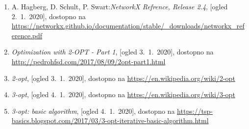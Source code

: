 \documentclass[12pt, a4paper]{article}
\begin{document}
\begin{enumerate}

\item A. Hagberg, D. Schult, P. Swart:\emph{NetworkX Refrence, Release 2.4}, [ogled 2.~1.~2020], dostopno na \url{https://networkx.github.io/documentation/stable/_downloads/networkx_reference.pdf}

\item \emph{Optimization with 2-OPT - Part 1}, [ogled 3.~1.~2020], dostopno na \url{http://pedrohfsd.com/2017/08/09/2opt-part1.html}

\item \emph{2-opt}, [ogled 3.~1.~2020], dostopno na \url{https://en.wikipedia.org/wiki/2-opt}

\item \emph{3-opt}, [ogled 4.~1.~2020], dostopno na \url{https://en.wikipedia.org/wiki/3-opt}

\item \emph{3-opt: basic algorithm}, [ogled 4.~1.~2020], dostopno na \url{https://tsp-basics.blogspot.com/2017/03/3-opt-iterative-basic-algorithm.html}
\end{enumerate}
\end{document}
